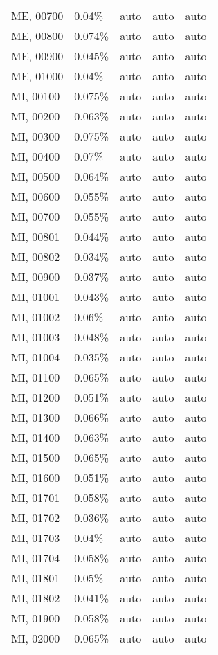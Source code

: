 \begin{longtable}[]{@{}lllll@{}}
ME, 00700 & 0.04\% & auto & auto & auto \\
ME, 00800 & 0.074\% & auto & auto & auto \\
ME, 00900 & 0.045\% & auto & auto & auto \\
ME, 01000 & 0.04\% & auto & auto & auto \\
MI, 00100 & 0.075\% & auto & auto & auto \\
MI, 00200 & 0.063\% & auto & auto & auto \\
MI, 00300 & 0.075\% & auto & auto & auto \\
MI, 00400 & 0.07\% & auto & auto & auto \\
MI, 00500 & 0.064\% & auto & auto & auto \\
MI, 00600 & 0.055\% & auto & auto & auto \\
MI, 00700 & 0.055\% & auto & auto & auto \\
MI, 00801 & 0.044\% & auto & auto & auto \\
MI, 00802 & 0.034\% & auto & auto & auto \\
MI, 00900 & 0.037\% & auto & auto & auto \\
MI, 01001 & 0.043\% & auto & auto & auto \\
MI, 01002 & 0.06\% & auto & auto & auto \\
MI, 01003 & 0.048\% & auto & auto & auto \\
MI, 01004 & 0.035\% & auto & auto & auto \\
MI, 01100 & 0.065\% & auto & auto & auto \\
MI, 01200 & 0.051\% & auto & auto & auto \\
MI, 01300 & 0.066\% & auto & auto & auto \\
MI, 01400 & 0.063\% & auto & auto & auto \\
MI, 01500 & 0.065\% & auto & auto & auto \\
MI, 01600 & 0.051\% & auto & auto & auto \\
MI, 01701 & 0.058\% & auto & auto & auto \\
MI, 01702 & 0.036\% & auto & auto & auto \\
MI, 01703 & 0.04\% & auto & auto & auto \\
MI, 01704 & 0.058\% & auto & auto & auto \\
MI, 01801 & 0.05\% & auto & auto & auto \\
MI, 01802 & 0.041\% & auto & auto & auto \\
MI, 01900 & 0.058\% & auto & auto & auto \\
MI, 02000 & 0.065\% & auto & auto & auto \\

\end{longtable}
